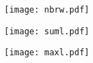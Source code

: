 \documentclass[a4paper]{article} %
\begin{document}
\begin{figure}
    \centering
    \texttt{[image: nbrw.pdf]}
\end{figure}

\begin{figure}
    \centering
    \texttt{[image: suml.pdf]}
\end{figure}

\begin{figure}
    \centering
    \texttt{[image: maxl.pdf]}
\end{figure}
\end{document}
